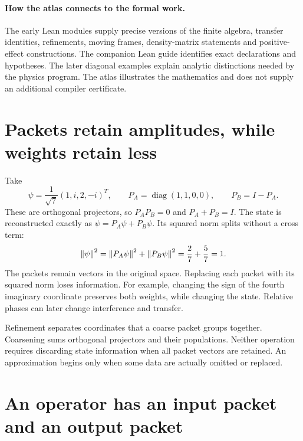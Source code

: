 \paragraph{How the atlas connects to the formal work.}
The early Lean modules supply precise versions of the finite algebra, transfer identities, refinements, moving frames, density-matrix statements and positive-effect constructions. The companion Lean guide identifies exact declarations and hypotheses. The later diagonal examples explain analytic distinctions needed by the physics program. The atlas illustrates the mathematics and does not supply an additional compiler certificate.

\clearpage
\section{Packets retain amplitudes, while weights retain less}

Take
\[
\psi=\frac1{\sqrt7}(1,i,2,-i)^T,\qquad
P_A=\operatorname{diag}(1,1,0,0),\qquad P_B=I-P_A.
\]
These are orthogonal projectors, so $P_AP_B=0$ and $P_A+P_B=I$. The state is reconstructed exactly as $\psi=P_A\psi+P_B\psi$. Its squared norm splits without a cross term:
\[
\left\lVert\psi\right\rVert^2=\left\lVert P_A\psi\right\rVert^2+\left\lVert P_B\psi\right\rVert^2
=\frac27+\frac57=1.
\]
The packets remain vectors in the original space. Replacing each packet with its squared norm loses information. For example, changing the sign of the fourth imaginary coordinate preserves both weights, while changing the state. Relative phases can later change interference and transfer.

Refinement separates coordinates that a coarse packet groups together. Coarsening sums orthogonal projectors and their populations. Neither operation requires discarding state information when all packet vectors are retained. An approximation begins only when some data are actually omitted or replaced.



\clearpage
\section{An operator has an input packet and an output packet}

